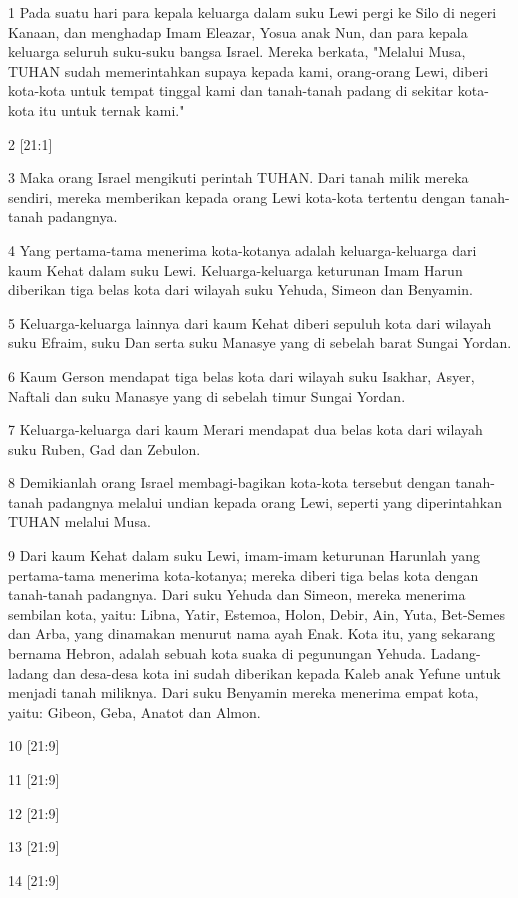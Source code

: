 \par 1 Pada suatu hari para kepala keluarga dalam suku Lewi pergi ke Silo di negeri Kanaan, dan menghadap Imam Eleazar, Yosua anak Nun, dan para kepala keluarga seluruh suku-suku bangsa Israel. Mereka berkata, "Melalui Musa, TUHAN sudah memerintahkan supaya kepada kami, orang-orang Lewi, diberi kota-kota untuk tempat tinggal kami dan tanah-tanah padang di sekitar kota-kota itu untuk ternak kami."
\par 2 [21:1]
\par 3 Maka orang Israel mengikuti perintah TUHAN. Dari tanah milik mereka sendiri, mereka memberikan kepada orang Lewi kota-kota tertentu dengan tanah-tanah padangnya.
\par 4 Yang pertama-tama menerima kota-kotanya adalah keluarga-keluarga dari kaum Kehat dalam suku Lewi. Keluarga-keluarga keturunan Imam Harun diberikan tiga belas kota dari wilayah suku Yehuda, Simeon dan Benyamin.
\par 5 Keluarga-keluarga lainnya dari kaum Kehat diberi sepuluh kota dari wilayah suku Efraim, suku Dan serta suku Manasye yang di sebelah barat Sungai Yordan.
\par 6 Kaum Gerson mendapat tiga belas kota dari wilayah suku Isakhar, Asyer, Naftali dan suku Manasye yang di sebelah timur Sungai Yordan.
\par 7 Keluarga-keluarga dari kaum Merari mendapat dua belas kota dari wilayah suku Ruben, Gad dan Zebulon.
\par 8 Demikianlah orang Israel membagi-bagikan kota-kota tersebut dengan tanah-tanah padangnya melalui undian kepada orang Lewi, seperti yang diperintahkan TUHAN melalui Musa.
\par 9 Dari kaum Kehat dalam suku Lewi, imam-imam keturunan Harunlah yang pertama-tama menerima kota-kotanya; mereka diberi tiga belas kota dengan tanah-tanah padangnya. Dari suku Yehuda dan Simeon, mereka menerima sembilan kota, yaitu: Libna, Yatir, Estemoa, Holon, Debir, Ain, Yuta, Bet-Semes dan Arba, yang dinamakan menurut nama ayah Enak. Kota itu, yang sekarang bernama Hebron, adalah sebuah kota suaka di pegunungan Yehuda. Ladang-ladang dan desa-desa kota ini sudah diberikan kepada Kaleb anak Yefune untuk menjadi tanah miliknya. Dari suku Benyamin mereka menerima empat kota, yaitu: Gibeon, Geba, Anatot dan Almon.
\par 10 [21:9]
\par 11 [21:9]
\par 12 [21:9]
\par 13 [21:9]
\par 14 [21:9]
